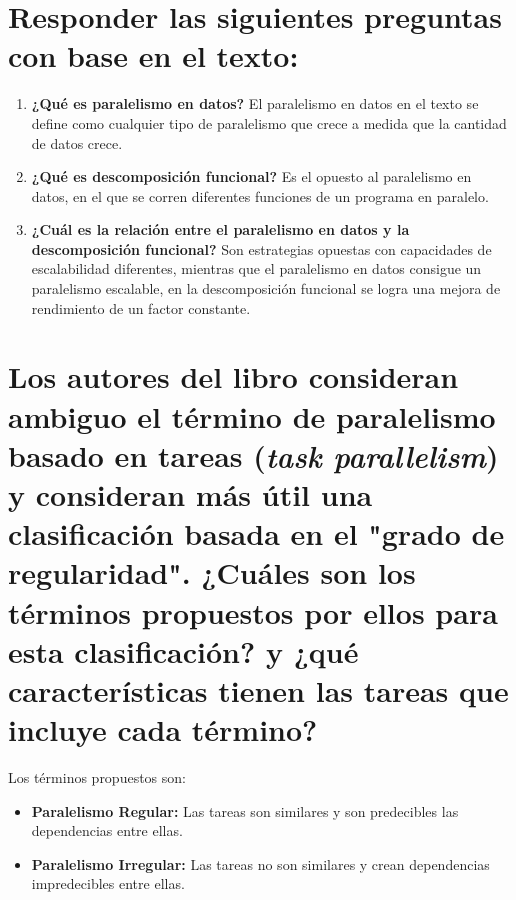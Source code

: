 \documentclass[11pt,a4paper]{article}
\begin{document}
\vspace{1.5em}

\section{Responder las siguientes preguntas con base en el texto:}

\begin{enumerate}[label=\textbf{\alph*)}, leftmargin=2em, itemsep=1em]
    \item \textbf{¿Qué es paralelismo en datos?}
    El paralelismo en datos en el texto se define como cualquier tipo de paralelismo que crece a medida que la cantidad de datos crece.

    \item \textbf{¿Qué es descomposición funcional?}
    Es el opuesto al paralelismo en datos, en el que se corren diferentes funciones de un programa en paralelo.

    \item \textbf{¿Cuál es la relación entre el paralelismo en datos y la descomposición funcional?}
    Son estrategias opuestas con capacidades de escalabilidad diferentes, mientras que el paralelismo en datos consigue un paralelismo escalable, en la descomposición funcional se logra una mejora de rendimiento de un factor constante.

\end{enumerate}

\vspace{1.5em}

\section{Los autores del libro consideran ambiguo el término de paralelismo basado en tareas (\textit{task parallelism}) y consideran más útil una clasificación basada en el "grado de regularidad". ¿Cuáles son los términos propuestos por ellos para esta clasificación? y ¿qué características tienen las tareas que incluye cada término?}


Los términos propuestos son:
\begin{itemize}[leftmargin=2em, itemsep=0.8em]
    \item \textbf{Paralelismo Regular:} Las tareas son similares y son predecibles las dependencias entre ellas.

    \item \textbf{Paralelismo Irregular:} Las tareas no son similares y crean dependencias impredecibles entre ellas.
\vspace{1.5em}
\end{itemize}
\end{document}
